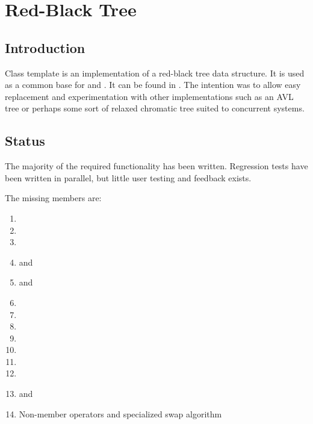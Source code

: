 
\chapter{Red-Black Tree}

\section{Introduction}

Class template  is an implementation of a
red-black tree data structure. It is used as a common base for 
and . It can be found in . The
intention was to allow easy replacement and experimentation with other
implementations such as an AVL tree or perhaps some sort of relaxed chromatic
tree suited to concurrent systems.

\section{Status}

The majority of the required functionality has been written. Regression tests
have been written in parallel, but little user testing and feedback exists.

The missing members are:


\begin{enumerate}
\item {}
\item {}
\item {}
\item {} and 
\item {} and 
\item {}
\item {}
\item {}
\item {}
\item {}
\item {}
\item {}
\item {} and 
\item Non-member operators and specialized swap algorithm
\end{enumerate}

